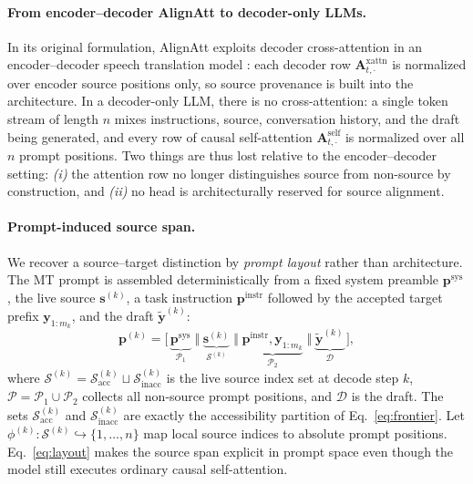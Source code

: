 \documentclass[11pt,twocolumn]{article}
\begin{document}
\paragraph{From encoder--decoder AlignAtt to decoder-only LLMs.}
In its original formulation, AlignAtt exploits decoder cross-attention in an
encoder--decoder speech translation model \cite{alignatt23}: each decoder row
$\mathbf{A}^{\mathrm{xattn}}_{t,\cdot}$ is normalized over encoder source
positions only, so source provenance is built into the architecture. In a
decoder-only LLM, there is no cross-attention: a single token stream of
length $n$ mixes instructions, source, conversation history, and the draft
being generated, and every row of causal self-attention
$\mathbf{A}^{\mathrm{self}}_{t,\cdot}$ is normalized over all $n$ prompt
positions. Two things are thus lost relative to the encoder--decoder setting:
\emph{(i)} the attention row no longer distinguishes source from non-source
by construction, and
\emph{(ii)} no head is architecturally reserved for source alignment.

\paragraph{Prompt-induced source span.}
We recover a source--target distinction by \emph{prompt layout} rather than
architecture. The MT prompt is assembled deterministically from a fixed system
preamble $\mathbf{p}^{\mathrm{sys}}$, the live source $\mathbf{s}^{(k)}$, a
task instruction $\mathbf{p}^{\mathrm{instr}}$ followed by the accepted target
prefix $\mathbf{y}_{1:m_k}$, and the draft $\widetilde{\mathbf{y}}^{(k)}$:
\begin{equation}
  \mathbf{p}^{(k)} = \bigl[\,
  \underbrace{\mathbf{p}^{\mathrm{sys}}}_{\mathcal{P}_1}
  \;\Vert\; \underbrace{\mathbf{s}^{(k)}}_{\mathcal{S}^{(k)}}
  \;\Vert\; \underbrace{\mathbf{p}^{\mathrm{instr}}, \mathbf{y}_{1:m_k}}_{\mathcal{P}_2}
  \;\Vert\; \underbrace{\widetilde{\mathbf{y}}^{(k)}}_{\mathcal{D}} \,\bigr],
  \label{eq:layout}
\end{equation}
where $\mathcal{S}^{(k)} = \mathcal{S}^{(k)}_{\mathrm{acc}} \sqcup \mathcal{S}^{(k)}_{\mathrm{inacc}}$
is the live source index set at decode step $k$, $\mathcal{P} = \mathcal{P}_1
\cup \mathcal{P}_2$ collects all non-source prompt positions, and
$\mathcal{D}$ is the draft. The sets $\mathcal{S}^{(k)}_{\mathrm{acc}}$ and
$\mathcal{S}^{(k)}_{\mathrm{inacc}}$ are exactly the accessibility partition
of Eq.~\eqref{eq:frontier}. Let
$\phi^{(k)} : \mathcal{S}^{(k)} \hookrightarrow \{1,\ldots,n\}$ map local
source indices to absolute prompt positions. Eq.~\eqref{eq:layout} makes the
source span explicit in prompt space even though the model still executes
ordinary causal self-attention.
\end{document}
